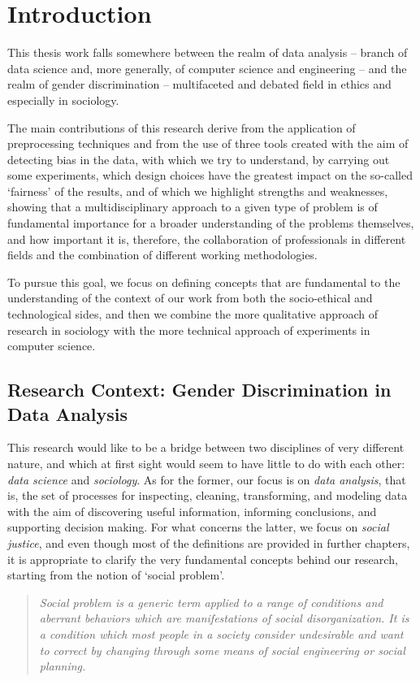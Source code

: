 \chapter{Introduction}
\label{chapter:introduction}
\thispagestyle{empty}

This thesis work falls somewhere between the realm of data analysis -- branch of data science and, more generally, of computer science and engineering -- and the realm of gender discrimination -- multifaceted and debated field in ethics and especially in sociology.

The main contributions of this research derive from the application of preprocessing techniques and from the use of three tools created with the aim of detecting bias in the data, with which we try to understand, by carrying out some experiments, which design choices have the greatest impact on the so-called `fairness' of the results, and of which we highlight strengths and weaknesses, showing that a multidisciplinary approach to a given type of problem is of fundamental importance for a broader understanding of the problems themselves, and how important it is, therefore, the collaboration of professionals in different fields and the combination of different working methodologies.

To pursue this goal, we focus on defining concepts that are fundamental to the understanding of the context of our work from both the socio-ethical and technological sides, and then we combine the more qualitative approach of research in sociology with the more technical approach of experiments in computer science.


\section{Research Context: Gender Discrimination in Data Analysis}
This research would like to be a bridge between two disciplines of very different nature, and which at first sight would seem to have little to do with each other: \textit{data science} and \textit{sociology}. As for the former, our focus is on \textit{data analysis}, that is, the set of processes for inspecting, cleaning, transforming, and modeling data with the aim of discovering useful information, informing conclusions, and supporting decision making. For what concerns the latter, we focus on \textit{social justice}, and even though most of the definitions are provided in further chapters, it is appropriate to clarify the very fundamental concepts behind our research, starting from the notion of `social problem'.
\begin{quote}\emph{Social problem is a generic term applied to a range of conditions and aberrant behaviors which are manifestations of social disorganization. It is a condition which most people in a society consider undesirable and want to correct by changing through some means of social engineering or social planning.} \cite{marschall1998oxford}\end{quote}

